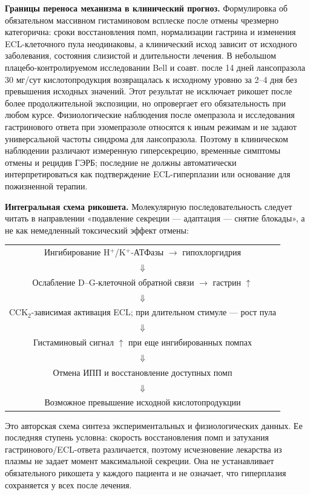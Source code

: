 \documentclass[11pt,a4paper,notitlepage]{report}
\newcommand{\src}[1]{\unskip\space\cite{#1}}
\begin{document}
\textbf{Границы переноса механизма в клинический прогноз.} Формулировка об обязательном массивном гистаминовом всплеске после отмены чрезмерно категорична: сроки восстановления помп, нормализации гастрина и изменения ECL-клеточного пула неодинаковы, а клинический исход зависит от исходного заболевания, состояния слизистой и длительности лечения. В небольшом плацебо-контролируемом исследовании Bell и соавт. после 14 дней лансопразола 30 мг/сут кислотопродукция возвращалась к исходному уровню за 2--4 дня без превышения исходных значений. Этот результат не исключает рикошет после более продолжительной экспозиции, но опровергает его обязательность при любом курсе.\src{withdrawbell} Физиологические наблюдения после омепразола и исследования гастринового ответа при эзомепразоле относятся к иным режимам и не задают универсальной частоты синдрома для лансопразола. Поэтому в клиническом наблюдении различают измеренную гиперсекрецию, временные симптомы отмены и рецидив ГЭРБ; последние не должны автоматически интерпретироваться как подтверждение ECL-гиперплазии или основание для пожизненной терапии.\src{withdrawwaldum1996,withdrawboyce2017,agadepres}

\textbf{Интегральная схема рикошета.} Молекулярную последовательность следует читать в направлении «подавление секреции --- адаптация --- снятие блокады», а не как немедленный токсический эффект отмены:
\begin{center}
\begin{tabular}{c}
Ингибирование H$^+$/K$^+$-АТФазы $\longrightarrow$ гипохлоргидрия \\
$\Downarrow$ \\
Ослабление D--G-клеточной обратной связи $\longrightarrow$ гастрин $\uparrow$ \\
$\Downarrow$ \\
CCK$_2$-зависимая активация ECL; при длительном стимуле --- рост пула \\
$\Downarrow$ \\
Гистаминовый сигнал $\uparrow$ при еще ингибированных помпах \\
$\Downarrow$ \\
Отмена ИПП и восстановление доступных помп \\
$\Downarrow$ \\
Возможное превышение исходной кислотопродукции
\end{tabular}
\end{center}
Это авторская схема синтеза экспериментальных и физиологических данных. Ее последняя ступень условна: скорость восстановления помп и затухания гастринового/ECL-ответа различается, поэтому исчезновение лекарства из плазмы не задает момент максимальной секреции. Она не устанавливает обязательного рикошета у каждого пациента и не означает, что гиперплазия сохраняется у всех после лечения.\src{withdrawbrand1988,withdrawsheng2020,molrestore,withdrawwaldum1996,withdrawboyce2017}
\end{document}
